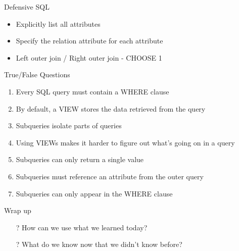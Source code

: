 \documentclass[aspectratio=169]{beamer}
\begin{document}
\begin{frame}{Defensive SQL}

\begin{itemize}
\item Explicitly list all attributes
\item Specify the relation attribute for each attribute
\item Left  outer join / Right outer join - CHOOSE 1
\end{itemize}
\end{frame}

\begin{frame}{True/False Questions}

\begin{enumerate}
\item Every SQL query must contain a WHERE clause %
\item  By default, a VIEW stores the data retrieved from the query %
\item Subqueries  isolate parts of queries %
\item Using VIEWs makes it harder to figure out what's going on in a query %
\item Subqueries can only return a single value %
\item Subqueries must reference an attribute from the outer query %
\item Subqueries can only appear in the WHERE clause %
\end{enumerate}

\end{frame}



\begin{frame}{Wrap up}
\begin{itemize}
	\item[?] How can we use what we learned today?
	\vspace{2em}
	\item[?] What do we know now that we didn't know before?
\end{itemize}

\end{frame}
\end{document}

